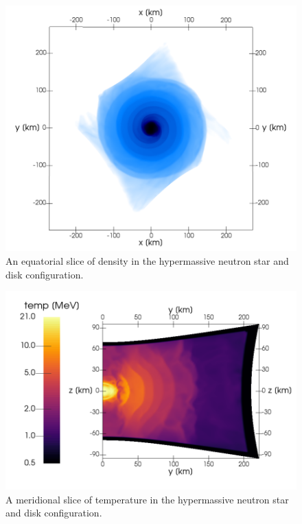 \documentclass[aps,floatfix,prd,superscriptaddress,twocolumn]{revtex4-1}
\begin{document}
\begin{figure}
  \includegraphics[width=\columnwidth]{production-colormap-equat-rho}
  \caption{An equatorial slice of density in the hypermassive neutron
    star and disk configuration.}
  \label{fig:nsns_rho_equat}
\end{figure}

\begin{figure}
  \includegraphics[width=\columnwidth]{production-colormap-merid-temp}
  \caption{A meridional slice of temperature in the hypermassive neutron
    star and disk configuration.}
  \label{fig:nsns_temp_merid}
\end{figure}
\end{document}
